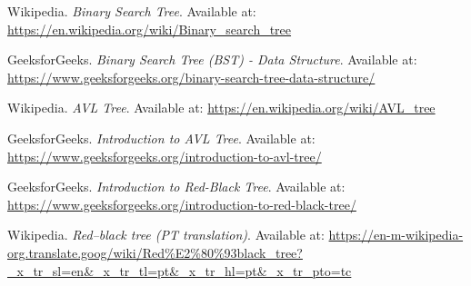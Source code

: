 \begin{thebibliography}{9}

Wikipedia.  
\textit{Binary Search Tree}.  
Available at: \url{https://en.wikipedia.org/wiki/Binary_search_tree}

GeeksforGeeks.  
\textit{Binary Search Tree (BST) - Data Structure}.  
Available at: \url{https://www.geeksforgeeks.org/binary-search-tree-data-structure/}

Wikipedia.  
\textit{AVL Tree}.  
Available at: \url{https://en.wikipedia.org/wiki/AVL_tree}

GeeksforGeeks.  
\textit{Introduction to AVL Tree}.  
Available at: \url{https://www.geeksforgeeks.org/introduction-to-avl-tree/}

GeeksforGeeks.  
\textit{Introduction to Red-Black Tree}.  
Available at: \url{https://www.geeksforgeeks.org/introduction-to-red-black-tree/}

Wikipedia.  
\textit{Red–black tree (PT translation)}.  
Available at: \url{https://en-m-wikipedia-org.translate.goog/wiki/Red%E2%80%93black_tree?_x_tr_sl=en&_x_tr_tl=pt&_x_tr_hl=pt&_x_tr_pto=tc}

\end{thebibliography}
